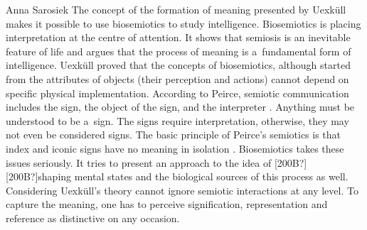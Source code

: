 \begin{artengenv}{Anna Sarosiek}
The concept of the formation of meaning presented by Uexküll makes it possible to use biosemiotics to study intelligence. Biosemiotics is placing interpretation at the centre of attention. It shows that semiosis is an inevitable feature of life and argues that the process of meaning is a~fundamental form of intelligence. Uexküll proved that the concepts of biosemiotics, although started from the attributes of objects (their perception and actions) cannot depend on specific physical implementation. According to Peirce, semiotic communication includes the sign, the object of the sign, and the interpreter
\parencite[][]{peirce_essential_1998}. %
 Anything must be understood to be a~sign. The signs require interpretation, otherwise, they may not even be considered signs. The basic principle of Peirce’s semiotics is that index and iconic signs have no meaning in isolation 
\parencite[][]{peirce_essential_1998}. %
 Biosemiotics takes these issues seriously. It tries to present an approach to the idea of [200B?][200B?]shaping mental states and the biological sources of this process as well. Considering Uexküll's theory cannot ignore semiotic interactions at any level. To capture the meaning, one has to perceive signification, representation and reference as distinctive on any occasion.


\end{artengenv}
